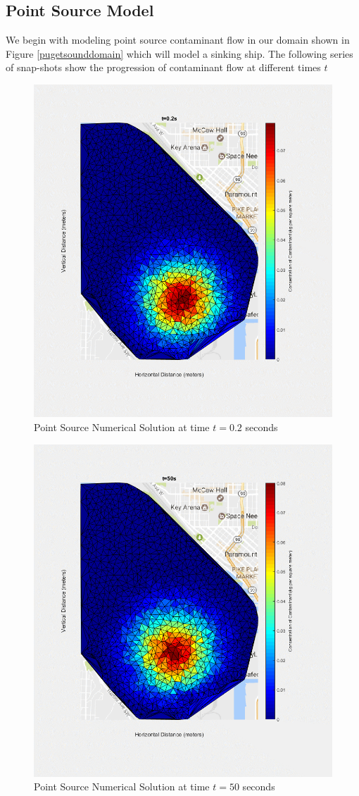 \documentclass[a4paper]{article}
\theoremstyle{remark}
\theoremstyle{remark}
\begin{document}
\subsection{Point Source Model}
We begin with modeling point source contaminant flow in our domain shown in Figure \ref{pugetsounddomain} which will model a sinking ship. The following series of snap-shots show the progression of contaminant flow at different times $t$

\begin{figure}[H]
   
\centering   
   \includegraphics[trim=0mm 0mm 0mm 0mm,clip,width=0.5\linewidth]{point1.png}
    \caption{Point Source Numerical Solution at time $t = 0.2$ seconds}
    \label{Results.2secondspoint}
\end{figure}

\begin{figure}[H]
   
\centering   
   \includegraphics[trim=0mm 0mm 0mm 0mm,clip,width=0.5\linewidth]{point2.png}
    \caption{Point Source Numerical Solution at time $t = 50$ seconds}
    \label{Results50secondspoint}
\end{figure}
\end{document}
